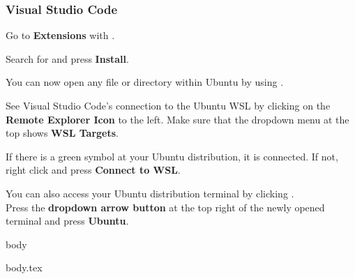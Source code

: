 \subsubsection{Visual Studio Code}


Go to \textbf{Extensions} with .

Search for  and press \textbf{Install}.

You can now open any file or directory within Ubuntu by using .

See Visual Studio Code's connection to the Ubuntu WSL by clicking on the \textbf{Remote Explorer Icon} to the left. Make sure that the dropdown menu at the top shows \textbf{WSL Targets}.

If there is a green symbol at your Ubuntu distribution, it is connected. If not,\\right click and press \textbf{Connect to WSL}.

You can also access your Ubuntu distribution terminal by clicking .\\
Press the \textbf{dropdown arrow button} at the top right of the newly opened terminal and press \textbf{Ubuntu}.

\ifdefined\wslRelevantVscodeCProgramming
{body}
\fi

\ifdefined\wslRelevantLatex
{body.tex}
\fi